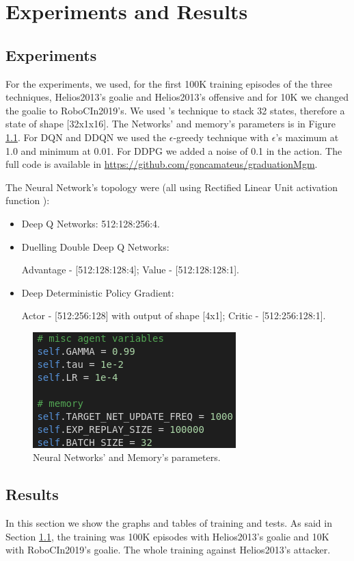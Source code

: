 \chapter{Experiments and Results}\label{chapter:results}
\section{Experiments}\label{section:exp}
For the experiments, we used, for the first 100K training episodes of the three techniques, Helios2013's goalie and Helios2013's offensive and for 10K we changed the goalie to RoboCIn2019's. We used \cite{dqn}'s technique to stack 32 states, therefore a state of shape [32x1x16]. The Networks' and memory's parameters is in Figure \ref{fig:hyperparams}. For DQN and DDQN we used the $\epsilon$-greedy technique with $\epsilon$'s maximum at 1.0 and minimum at 0.01. For DDPG we added a noise of 0.1 in the action. The full code is available in \url{https://github.com/goncamateus/graduationMgm}.

The Neural Network's topology were (all using Rectified Linear Unit activation function \cite{relu}):
\begin{itemize}
    \item Deep Q Networks: 512:128:256:4.
    \item Duelling Double Deep Q Networks: 
    
    Advantage - [512:128:128:4]; Value - [512:128:128:1].
    \item Deep Deterministic Policy Gradient: 
    
    Actor - [512:256:128] with output of shape [4x1]; Critic - [512:256:128:1].
\end{itemize}


\begin{figure}
    \centering
    \includegraphics[scale=0.6]{images/hyperparams.png}
    \caption{Neural Networks' and Memory's parameters.}
    \label{fig:hyperparams}
\end{figure}

\section{Results}
In this section we show the graphs and tables of training and tests. As said in Section \ref{section:exp}, the training was 100K episodes with Helios2013's goalie and 10K with RoboCIn2019's goalie. The whole training against Helios2013's attacker.
